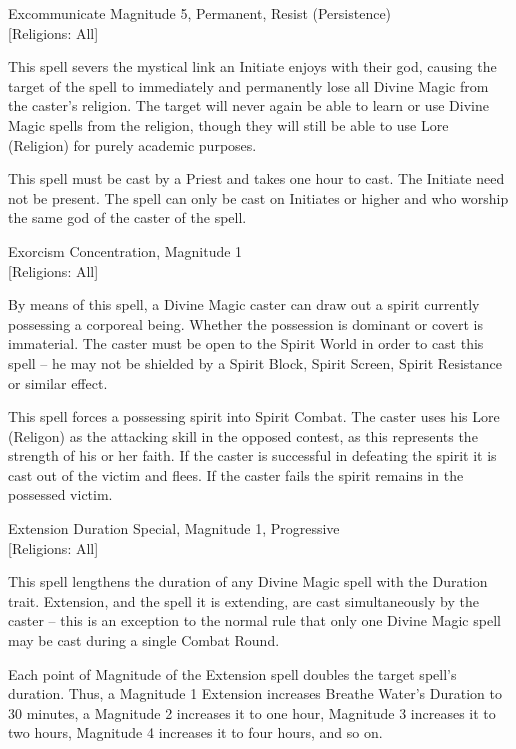 \begin{samepage}
\begin{rpg-spell}
{Excommunicate}
{Magnitude 5, Permanent, Resist (Persistence)\\{[Religions: All]}}

This spell severs the mystical link an Initiate enjoys with their god, causing the target of the spell to immediately and permanently lose all Divine Magic from the caster’s religion. The target will never again be able to learn or use Divine Magic spells from the religion, though they will still be able to use Lore (Religion) for purely academic purposes. 

This spell must be cast by a Priest and takes one hour to cast. The Initiate need not be present. The spell can only be cast on Initiates or higher and who worship the same god of the caster of the spell.
\end{rpg-spell}
\end{samepage}

\begin{samepage}
\begin{rpg-spell}
{Exorcism}
{Concentration, Magnitude 1\\{[Religions: All]}}

By means of this spell, a Divine Magic caster can draw out a spirit currently possessing a corporeal being. Whether the possession is dominant or covert is immaterial. The caster must be open to the Spirit World in order to cast this spell – he may not be shielded by a Spirit Block, Spirit Screen, Spirit Resistance or similar effect. 

This spell forces a possessing spirit into Spirit Combat. The caster uses his Lore (Religon) as the attacking skill in the opposed contest, as this represents the strength of his or her faith. If the caster is successful in defeating the spirit it is cast out of the victim and flees. If the caster fails the spirit remains in the possessed victim.
\end{rpg-spell}
\end{samepage}

\begin{samepage}
\begin{rpg-spell}
{Extension}
{Duration Special, Magnitude 1, Progressive\\{[Religions: All]}}

This spell lengthens the duration of any Divine Magic spell with the Duration trait. Extension, and the spell it is extending, are cast simultaneously by the caster – this is an exception to the normal rule that only one Divine Magic spell may be cast during a single Combat Round. 

Each point of Magnitude of the Extension spell doubles the target spell’s duration. Thus, a Magnitude 1 Extension increases Breathe Water’s Duration to 30 minutes, a Magnitude 2 increases it to one hour, Magnitude 3 increases it to two hours, Magnitude 4 increases it to four hours, and so on.
\end{rpg-spell}
\end{samepage}

